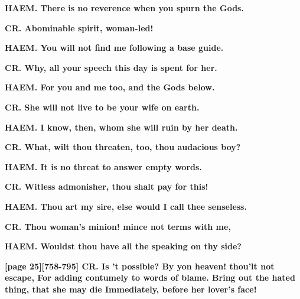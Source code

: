 \documentclass[11pt,letter]{book}
\begin{document}
\par \textbf{HAEM. There is no reverence when you spurn the Gods.}
\par 

\par \textbf{CR. Abominable spirit, woman-led!}
\par 

\par \textbf{HAEM. You will not find me following a base guide.}
\par 

\par \textbf{CR. Why, all your speech this day is spent for her.}
\par 

\par \textbf{HAEM. For you and me too, and the Gods below.}
\par 

\par \textbf{CR. She will not live to be your wife on earth.}
\par 

\par \textbf{HAEM. I know, then, whom she will ruin by her death.}
\par 

\par \textbf{CR. What, wilt thou threaten, too, thou audacious boy?}
\par 

\par \textbf{HAEM. It is no threat to answer empty words.}
\par 

\par \textbf{CR. Witless admonisher, thou shalt pay for this!}
\par 

\par \textbf{HAEM. Thou art my sire, else would I call thee senseless.}
\par 

\par \textbf{CR. Thou woman’s minion! mince not terms with me,}
\par 

\par \textbf{HAEM. Wouldst thou have all the speaking on thy side?}
\par 

\par \textbf{[page 25][758-795] CR. Is ’t possible? By yon heaven! thou’lt not escape, For adding contumely to words of blame. Bring out the hated thing, that she may die Immediately, before her lover’s face!}
\par 
\end{document}
